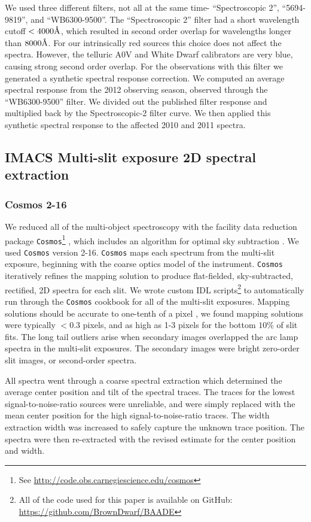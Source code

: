 \documentclass[12pt,preprint]{aastex}
\newcommand{\angstrom}{\mbox{\normalfont\AA}}
\begin{document}
We used three different filters, not all at the same time- ``Spectroscopic 2'', ``5694-9819'', and ``WB6300-9500''.  The ``Spectroscopic 2'' filter had a short wavelength cutoff $<4000 \angstrom$, which resulted in second order overlap for wavelengths longer than $8000 \angstrom$.  For our intrinsically red sources this choice does not affect the spectra.  However, the telluric A0V and White Dwarf calibrators are very blue, causing strong second order overlap.  For the observations with this filter we generated a synthetic spectral response correction.  We computed an average spectral response from the 2012 observing season, observed through the ``WB6300-9500'' filter.  We divided out the published filter response and multiplied back by the Spectroscopic-2 filter curve.  We then applied this synthetic spectral response to the affected 2010 and 2011 spectra.

\subsection{IMACS Multi-slit exposure 2D spectral extraction}
\subsubsection{Cosmos 2-16}
We reduced all of the multi-object spectroscopy with the facility data reduction package \texttt{Cosmos}\footnote{See \url{http://code.obs.carnegiescience.edu/cosmos}} \citep{2011PASP..123..288D} , which includes an algorithm for optimal sky subtraction \citep{2003PASP..115..688K}.  We used \texttt{Cosmos} version 2-16.  \texttt{Cosmos} maps each spectrum from the multi-slit exposure, beginning with the coarse optics model of the instrument.  \texttt{Cosmos} iteratively refines the mapping solution to produce flat-fielded, sky-subtracted, rectified, 2D spectra for each slit.  We wrote custom IDL scripts\footnote{All of the code used for this paper is available on GitHub: \url{https://github.com/BrownDwarf/BAADE}} to automatically run through the \texttt{Cosmos} cookbook for all of the multi-slit exposures.  Mapping solutions should be accurate to one-tenth of a pixel \citep{2011PASP..123..288D}, we found mapping solutions were typically $<0.3$ pixels, and as high as 1-3 pixels for the bottom $10\%$ of slit fits.  The long tail outliers arise when secondary images overlapped the arc lamp spectra in the multi-slit exposures.  The secondary images were bright zero-order slit images, or second-order spectra.


All spectra went through a coarse spectral extraction which determined the average center position and tilt of the spectral traces.  The traces for the lowest signal-to-noise-ratio sources were unreliable, and were simply replaced with the mean center position for the high signal-to-noise-ratio traces.  The width extraction width was increased to safely capture the unknown trace position.  The spectra were then re-extracted with the revised estimate for the center position and width.
\end{document}
